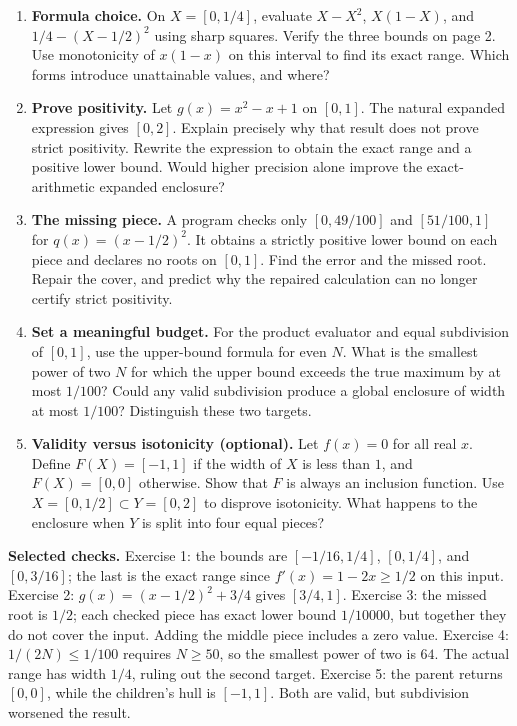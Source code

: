 \begin{enumerate}
\item \textbf{Formula choice.} On $X=[0,1/4]$, evaluate $X-X^2$,
$X(1-X)$, and $1/4-(X-1/2)^2$ using sharp squares. Verify the three bounds
on page 2. Use monotonicity of $x(1-x)$ on this interval to find its exact
range. Which forms introduce unattainable values, and where?

\item \textbf{Prove positivity.} Let $g(x)=x^2-x+1$ on $[0,1]$.
The natural expanded expression gives $[0,2]$. Explain precisely why that
result does not prove strict positivity. Rewrite the expression to obtain
the exact range and a positive lower bound. Would higher precision alone
improve the exact-arithmetic expanded enclosure?

\item \textbf{The missing piece.} A program checks only $[0,49/100]$ and
$[51/100,1]$ for $q(x)=(x-1/2)^2$. It obtains a strictly positive lower
bound on each piece and declares no roots on $[0,1]$. Find the error and
the missed root. Repair the cover, and predict why the repaired calculation
can no longer certify strict positivity.

\item \textbf{Set a meaningful budget.} For the product evaluator and
equal subdivision of $[0,1]$, use the upper-bound formula for even $N$.
What is the smallest power of two $N$ for which the upper bound exceeds
the true maximum by at most $1/100$? Could any valid subdivision produce
a global enclosure of width at most $1/100$? Distinguish these two targets.

\item \textbf{Validity versus isotonicity (optional).} Let $f(x)=0$ for all
real $x$. Define $F(X)=[-1,1]$ if the width of $X$ is less than $1$, and
$F(X)=[0,0]$ otherwise. Show that $F$ is always an inclusion function.
Use $X=[0,1/2]\subset Y=[0,2]$ to disprove isotonicity. What happens to
the enclosure when $Y$ is split into four equal pieces?
\end{enumerate}

\textbf{Selected checks.} Exercise 1: the bounds are $[-1/16,1/4]$,
$[0,1/4]$, and $[0,3/16]$; the last is the exact range since
$f'(x)=1-2x\geq1/2$ on this input. Exercise 2:
$g(x)=(x-1/2)^2+3/4$ gives $[3/4,1]$. Exercise 3: the missed root is
$1/2$; each checked piece has exact lower bound $1/10000$, but together
they do not cover the input. Adding the middle piece includes a zero value.
Exercise 4: $1/(2N)\leq1/100$ requires $N\geq50$, so the smallest power
of two is $64$. The actual range has width $1/4$, ruling out the second
target. Exercise 5: the parent returns $[0,0]$, while the children's hull
is $[-1,1]$. Both are valid, but subdivision worsened the result.

